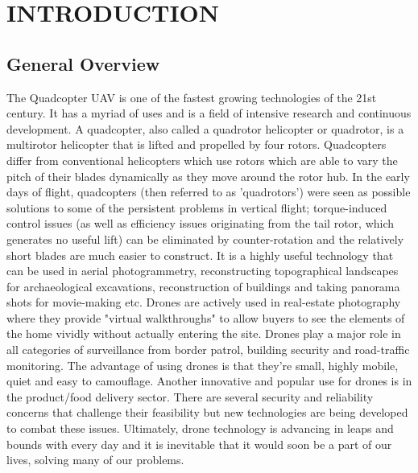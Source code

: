 
\chapter{INTRODUCTION} %
\section{General Overview} %
The Quadcopter UAV is one of the fastest growing technologies of the 21st century. It has a myriad of uses and is a field of intensive research and continuous development. 
A quadcopter, also called a quadrotor helicopter or quadrotor, is a multirotor helicopter that is lifted and propelled by four rotors. Quadcopters differ from conventional helicopters which use rotors which are able to vary the pitch of their blades dynamically as they move around the rotor hub. In the early days of flight, quadcopters (then referred to as 'quadrotors') were seen as possible solutions to some of the persistent problems in vertical flight; torque-induced control issues (as well as efficiency issues originating from the tail rotor, which generates no useful lift) can be eliminated by counter-rotation and the relatively short blades are much easier to construct.
\newline
\newline
It is a highly useful technology that can be used in aerial photogrammetry, reconstructing topographical landscapes for archaeological excavations, reconstruction of buildings and taking panorama shots for movie-making etc. Drones are actively used in real-estate photography where they provide "virtual walkthroughs" to allow buyers to see the elements of the home vividly without actually entering the site.
\newline
Drones play a major role in all categories of surveillance from border patrol, building security and road-traffic monitoring. The advantage of using drones is that they're small, highly mobile, quiet and easy to camouflage. 
\newline 
Another innovative and popular use for drones is in the product/food delivery sector. There are several security and reliability concerns that challenge their feasibility but new technologies are being developed to combat these issues.
\newline
Ultimately, drone technology is advancing in leaps and bounds with every day and it is inevitable that it would soon be a part of our lives, solving many of our problems.

